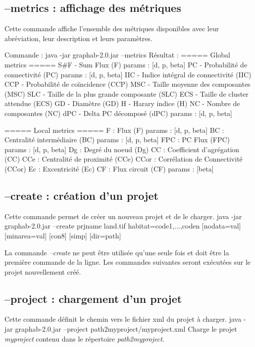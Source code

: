 \documentclass[a4paper,10pt]{report}
\newenvironment{cmd}
{\quote\Verbatim}
{\endVerbatim\endquote}
\begin{document}
\subsection{--metrics : affichage des métriques}
Cette commande affiche l'ensemble des métriques disponibles avec leur abréviation, leur description et leurs paramètres.

Commande :
\begin{cmd}
java -jar graphab-2.0.jar --metrics
\end{cmd}
Résultat :
\begin{cmd}
===== Global metrics =====
S#F - Sum Flux (F)
	params : [d, p, beta]
PC - Probabilité de connectivité (PC)
	params : [d, p, beta]
IIC - Indice intégral de connectivité (IIC)
CCP - Probabilité de coïncidence (CCP)
MSC - Taille moyenne des composantes (MSC)
SLC - Taille de la plus grande composante (SLC)
ECS - Taille de cluster attendue (ECS)
GD - Diamètre (GD)
H - Harary indice (H)
NC - Nombre de composantes (NC)
dPC - Delta PC décomposé (dPC)
	params : [d, p, beta]

===== Local metrics =====
F : Flux (F)
	params : [d, p, beta]
BC : Centralité intermédiaire (BC)
	params : [d, p, beta]
FPC : PC Flux (FPC)
	params : [d, p, beta]
Dg : Degré du noeud (Dg)
CC : Coefficient d'agrégation (CC)
CCe : Centralité de proximité (CCe)
CCor : Corrélation de Connectivité (CCor)
Ec : Excentricité (Ec)
CF : Flux circuit (CF)
	params : [beta]

\end{cmd}

\subsection{--create : création d'un projet}
Cette commande permet de créer un nouveau projet et de le charger.
\begin{cmd}
java -jar graphab-2.0.jar --create prjname land.tif habitat=code1,...,coden [nodata=val]
	[minarea=val] [con8] [simp] [dir=path]
\end{cmd}

La commande \textit{--create} ne peut être utilisée qu'une seule fois et doit être la première commande de la ligne.
Les commandes suivantes seront exécutées sur le projet nouvellement créé.

\subsection{--project : chargement d'un projet}
Cette commande définit le chemin vers le fichier xml du projet à charger.
\begin{cmd}
java -jar graphab-2.0.jar --project path2myproject/myproject.xml
\end{cmd}
Charge le projet \textit{myproject} contenu dans le répertoire \textit{path2myproject}.
\end{document}
